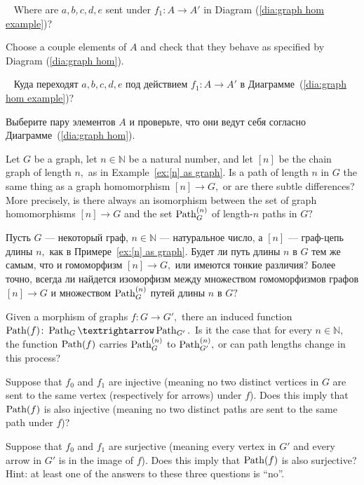 \documentclass[../main/CT4S-EN-RU]{subfiles}
\begin{document}
\begin{exerciseENG}~
\sexc Where are $a,b,c,d,e$ sent under $f_1\colon A{→} A'$ in Diagram (\ref{dia:graph hom example})? 
\item Choose a couple elements of $A$ and check that they behave as specified by Diagram (\ref{dia:graph hom}).
\endsexc
\end{exerciseENG}

\begin{exerciseRUS}~
\sexc Куда переходят $a,b,c,d,e$ под действием $f_1\colon A{→} A'$ в Диаграмме~(\ref{dia:graph hom example})? 
\item Выберите пару элементов $A$ и проверьте, что они ведут себя согласно Диаграмме~(\ref{dia:graph hom}).
\endsexc
\end{exerciseRUS}

\begin{exerciseENG}
Let $G$ be a graph, let $n\in{ℕ}$ be a natural number, and let $[n]$ be the chain graph of length $n,$ as in Example~\ref{ex:[n] as graph}. Is a path of length $n$ in $G$ the same thing as a graph homomorphism $[n]{→} G,$ or are there subtle differences? More precisely, is there always an isomorphism between the set of graph homomorphisms $[n]{→} G$ and the set $\operatorname{Path}_G^{(n)}$ of length-$n$ paths in $G?$
\end{exerciseENG}

\begin{exerciseRUS}
Пусть $G$ — некоторый граф, $n\in{ℕ}$ — натуральное число, а $[n]$ — граф-цепь длины $n,$ как в Примере~\ref{ex:[n] as graph}. Будет ли путь длины $n$ в $G$ тем же самым, что и гомоморфизм $[n]{→} G,$ или имеются тонкие различия? Более точно, всегда ли найдется изоморфизм между множеством гомоморфизмов графов $[n]{→} G$ и множеством $\operatorname{Path}_G^{(n)}$ путей длины $n$ в $G?$
\end{exerciseRUS}

\begin{exerciseENG}
Given a morphism of graphs $f\colon G{→} G',$ there an induced function $\Path(f)\colon\Path_{G}{→}\Path_{G'}.$ 
\sexc Is it the case that for every $n\in{ℕ},$ the function $\operatorname{Path}(f)$ carries $\operatorname{Path}^{(n)}_{G}$ to $\operatorname{Path}^{(n)}_{G'},$ or can path lengths change in this process?
\item Suppose that $f_0$ and $f_1$ are injective (meaning no two distinct vertices in $G$ are sent to the same vertex (respectively for arrows) under $f$). Does this imply that $\operatorname{Path}(f)$ is also injective (meaning no two distinct paths are sent to the same path under $f$)?
\item Suppose that $f_0$ and $f_1$ are surjective (meaning every vertex in $G'$ and every arrow in $G'$ is in the image of $f$). Does this imply that $\operatorname{Path}(f)$ is also surjective? Hint: at least one of the answers to these three questions is “no”.
\endsexc
\end{exerciseENG}
\end{document}
